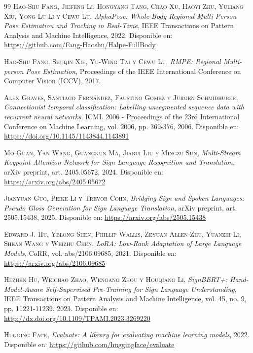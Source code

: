 \begin{thebibliography}{99}
 \textsc{Hao-Shu Fang, Jiefeng Li, Hongyang Tang, Chao Xu, Haoyi Zhu, Yuliang Xiu, Yong-Lu Li y Cewu Lu}, \textit{AlphaPose: Whole-Body Regional Multi-Person Pose Estimation and Tracking in Real-Time}, IEEE Transactions on Pattern Analysis and Machine Intelligence, 2022. Disponible en: \url{https://github.com/Fang-Haoshu/Halpe-FullBody}

 \textsc{Hao-Shu Fang, Shuqin Xie, Yu-Wing Tai y Cewu Lu}, \textit{RMPE: Regional Multi-person Pose Estimation}, Proceedings of the IEEE International Conference on Computer Vision (ICCV), 2017.

 \textsc{Alex Graves, Santiago Fernández, Faustino Gomez y Jürgen Schmidhuber}, \textit{Connectionist temporal classification: Labelling unsegmented sequence data with recurrent neural networks}, ICML 2006 - Proceedings of the 23rd International Conference on Machine Learning, vol. 2006, pp. 369-376, 2006. Disponible en: \url{https://doi.org/10.1145/1143844.1143891}

 \textsc{Mo Guan, Yan Wang, Guangkun Ma, Jiarui Liu y Mingzu Sun}, \textit{Multi-Stream Keypoint Attention Network for Sign Language Recognition and Translation}, arXiv preprint, art. 2405.05672, 2024. Disponible en: \url{https://arxiv.org/abs/2405.05672}

 \textsc{Jianyuan Guo, Peike Li y Trevor Cohn}, \textit{Bridging Sign and Spoken Languages: Pseudo Gloss Generation for Sign Language Translation}, arXiv preprint, art. 2505.15438, 2025. Disponible en: \url{https://arxiv.org/abs/2505.15438}

 \textsc{Edward J. Hu, Yelong Shen, Phillip Wallis, Zeyuan Allen-Zhu, Yuanzhi Li, Shean Wang y Weizhu Chen}, \textit{LoRA: Low-Rank Adaptation of Large Language Models}, CoRR, vol. abs/2106.09685, 2021. Disponible en: \url{https://arxiv.org/abs/2106.09685}

 \textsc{Hezhen Hu, Weichao Zhao, Wengang Zhou y Houqiang Li}, \textit{SignBERT+: Hand-Model-Aware Self-Supervised Pre-Training for Sign Language Understanding}, IEEE Transactions on Pattern Analysis and Machine Intelligence, vol. 45, no. 9, pp. 11221-11239, 2023. Disponible en: \url{http://dx.doi.org/10.1109/TPAMI.2023.3269220}

 \textsc{Hugging Face}, \textit{Evaluate: A library for evaluating machine learning models}, 2022. Disponible en: \url{https://github.com/huggingface/evaluate}


\end{thebibliography}
